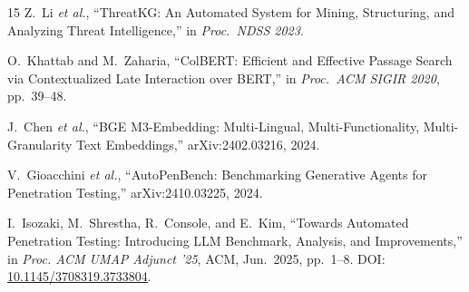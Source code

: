 \documentclass[conference]{IEEEtran}
\begin{document}
\begin{thebibliography}{15}
Z.~Li \textit{et al.},
``ThreatKG: An Automated System for Mining, Structuring, and Analyzing Threat
Intelligence,''
in \textit{Proc.\ NDSS 2023}.

O.~Khattab and M.~Zaharia,
``ColBERT: Efficient and Effective Passage Search via Contextualized Late
Interaction over BERT,''
in \textit{Proc.\ ACM SIGIR 2020}, pp.~39--48.

J.~Chen \textit{et al.},
``BGE M3-Embedding: Multi-Lingual, Multi-Functionality, Multi-Granularity
Text Embeddings,''
arXiv:2402.03216, 2024.

V.~Gioacchini \textit{et al.},
``AutoPenBench: Benchmarking Generative Agents for Penetration Testing,''
arXiv:2410.03225, 2024.

I.~Isozaki, M.~Shrestha, R.~Console, and E.~Kim,
``Towards Automated Penetration Testing: Introducing LLM Benchmark, Analysis,
and Improvements,''
in \textit{Proc. ACM UMAP Adjunct '25}, ACM, Jun.\ 2025,
pp.\ 1--8. DOI: \href{https://doi.org/10.1145/3708319.3733804}{10.1145/3708319.3733804}.

\end{thebibliography}
\end{document}
